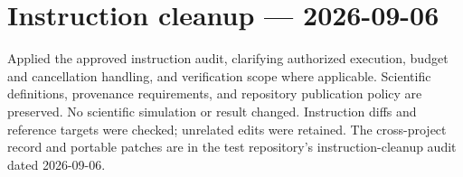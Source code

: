 \documentclass{article}
\begin{document}
\section*{Instruction cleanup --- 2026-09-06}
Applied the approved instruction audit, clarifying authorized execution,
budget and cancellation handling, and verification scope where applicable.
Scientific definitions, provenance requirements, and repository publication
policy are preserved. No scientific simulation or result changed.
Instruction diffs and reference targets were checked; unrelated edits were
retained. The cross-project record and portable patches are in the test
repository's instruction-cleanup audit dated 2026-09-06.
\end{document}
